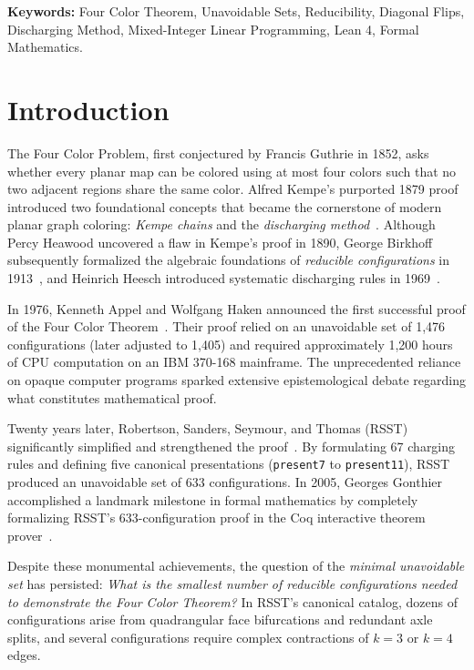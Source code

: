 \documentclass[11pt,a4paper]{article}
\theoremstyle{plain}
\theoremstyle{definition}
\begin{document}
\noindent\textbf{Keywords:} Four Color Theorem, Unavoidable Sets, Reducibility, Diagonal Flips, Discharging Method, Mixed-Integer Linear Programming, Lean 4, Formal Mathematics.

\section{Introduction}

The Four Color Problem, first conjectured by Francis Guthrie in 1852, asks whether every planar map can be colored using at most four colors such that no two adjacent regions share the same color. Alfred Kempe's purported 1879 proof introduced two foundational concepts that became the cornerstone of modern planar graph coloring: \emph{Kempe chains} and the \emph{discharging method}~\cite{kempe1879geographical}. Although Percy Heawood uncovered a flaw in Kempe's proof in 1890, George Birkhoff subsequently formalized the algebraic foundations of \emph{reducible configurations} in 1913~\cite{birkhoff1913reducibility}, and Heinrich Heesch introduced systematic discharging rules in 1969~\cite{heesch1969untersuchungen}.

In 1976, Kenneth Appel and Wolfgang Haken announced the first successful proof of the Four Color Theorem~\cite{appel1977every1, appel1977every2}. Their proof relied on an unavoidable set of 1,476 configurations (later adjusted to 1,405) and required approximately 1,200 hours of CPU computation on an IBM 370-168 mainframe. The unprecedented reliance on opaque computer programs sparked extensive epistemological debate regarding what constitutes mathematical proof.

Twenty years later, Robertson, Sanders, Seymour, and Thomas (RSST) significantly simplified and strengthened the proof~\cite{robertson1997four}. By formulating 67 charging rules and defining five canonical presentations (\texttt{present7} to \texttt{present11}), RSST produced an unavoidable set of 633 configurations. In 2005, Georges Gonthier accomplished a landmark milestone in formal mathematics by completely formalizing RSST's 633-configuration proof in the Coq interactive theorem prover~\cite{gonthier2008formal}. 

Despite these monumental achievements, the question of the \emph{minimal unavoidable set} has persisted: \emph{What is the smallest number of reducible configurations needed to demonstrate the Four Color Theorem?} In RSST's canonical catalog, dozens of configurations arise from quadrangular face bifurcations and redundant axle splits, and several configurations require complex contractions of $k = 3$ or $k = 4$ edges.
\end{document}
